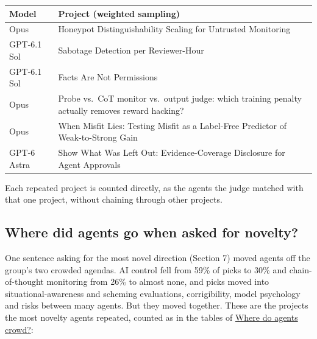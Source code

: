 \documentclass[11pt]{article}
\newcounter{none}
\begin{document}
{\def\LTcaptype{none} %
\begin{longtable}[]{@{}
  >{\raggedright\arraybackslash}p{}
  >{\raggedright\arraybackslash}p{}@{}}
\toprule\noalign{}
\begin{minipage}[b]{\linewidth}\raggedright
Model
\end{minipage} & \begin{minipage}[b]{\linewidth}\raggedright
Project (weighted sampling)
\end{minipage} \\
\midrule\noalign{}
\endhead
\bottomrule\noalign{}
\endlastfoot
Opus & Honeypot Distinguishability Scaling for Untrusted Monitoring \\
GPT-6.1 Sol & Sabotage Detection per Reviewer-Hour \\
GPT-6.1 Sol & Facts Are Not Permissions \\
Opus & Probe vs.~CoT monitor vs.~output judge: which training penalty
actually removes reward hacking? \\
Opus & When Misfit Lies: Testing Misfit as a Label-Free Predictor of
Weak-to-Strong Gain \\
GPT-6 Astra & Show What Was Left Out: Evidence-Coverage Disclosure for
Agent Approvals \\
\end{longtable}
}

Each repeated project is counted directly, as the agents the judge
matched with that one project, without chaining through other projects.

\subsection{Where did agents go when asked for
novelty?}\label{where-did-agents-go-when-asked-for-novelty}

One sentence asking for the most novel direction (Section 7) moved
agents off the group's two crowded agendas. AI control fell from 59\% of
picks to 30\% and chain-of-thought monitoring from 26\% to almost none,
and picks moved into situational-awareness and scheming evaluations,
corrigibility, model psychology and risks between many agents. But they
moved together. These are the projects the most novelty agents repeated,
counted as in the tables of \hyperref[where-do-agents-crowd]{Where do
agents crowd?}:
\end{document}
